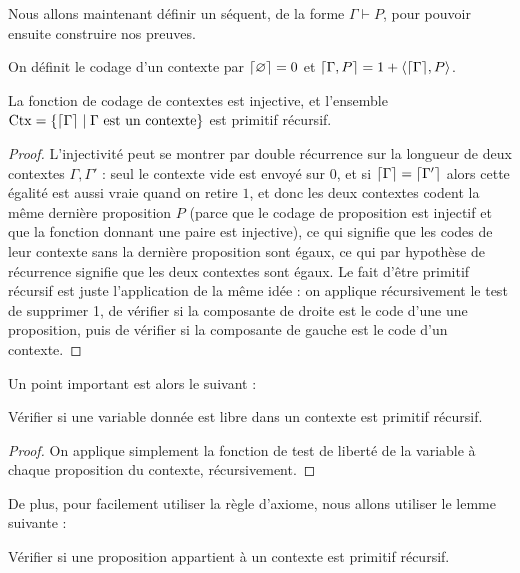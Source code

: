 Nous allons maintenant définir un séquent, de la forme $\Gamma\vdash P$, pour pouvoir ensuite construire nos preuves.

\begin{defi}
    On définit le codage d'un contexte par $\lceil \varnothing \rceil = 0$ et $\lceil \Gamma,P \rceil = 1 + \langle \lceil \Gamma \rceil,P\rangle$.
\end{defi}

\begin{lem}
    La fonction de codage de contextes est injective, et l'ensemble $\mathrm{Ctx} = \{\lceil \Gamma \rceil\mid \Gamma\text{ est un contexte}\}$ est primitif récursif.
\end{lem}

\begin{proof}
    L'injectivité peut se montrer par double récurrence sur la longueur de deux contextes $\Gamma,\Gamma'$ : seul le contexte vide est envoyé sur $0$, et si $\lceil \Gamma \rceil=\lceil \Gamma' \rceil$ alors cette égalité est aussi vraie quand on retire $1$, et donc les deux contextes codent la même dernière proposition $P$ (parce que le codage de proposition est injectif et que la fonction donnant une paire est injective), ce qui signifie que les codes de leur contexte sans la dernière proposition sont égaux, ce qui par hypothèse de récurrence signifie que les deux contextes sont égaux. Le fait d'être primitif récursif est juste l'application de la même idée : on applique récursivement le test de supprimer 1, de vérifier si la composante de droite est le code d'une une proposition, puis de vérifier si la composante de gauche est le code d'un contexte.
\end{proof}

Un point important est alors le suivant :

\begin{lem}
    Vérifier si une variable donnée est libre dans un contexte est primitif récursif.
\end{lem}

\begin{proof}
    On applique simplement la fonction de test de liberté de la variable à chaque proposition du contexte, récursivement.
\end{proof}

De plus, pour facilement utiliser la règle d'axiome, nous allons utiliser le lemme suivante :

\begin{lem}
    Vérifier si une proposition appartient à un contexte est primitif récursif.
\end{lem}

